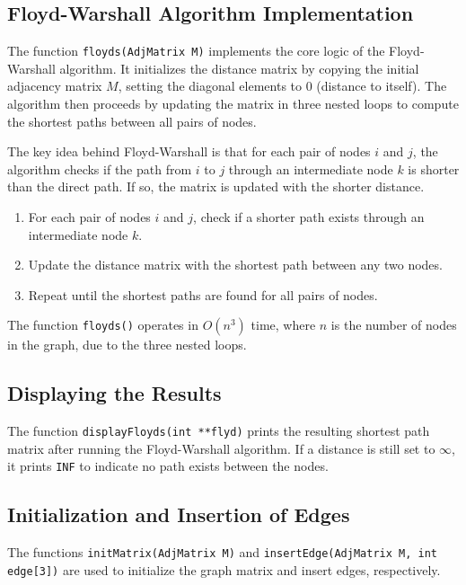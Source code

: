 \documentclass{book}
\begin{document}
\subsection{Floyd-Warshall Algorithm Implementation}

The function \texttt{floyds(AdjMatrix M)} implements the core logic of the Floyd-Warshall algorithm. It initializes the distance matrix by copying the initial adjacency matrix \( M \), setting the diagonal elements to 0 (distance to itself). The algorithm then proceeds by updating the matrix in three nested loops to compute the shortest paths between all pairs of nodes.

The key idea behind Floyd-Warshall is that for each pair of nodes \( i \) and \( j \), the algorithm checks if the path from \( i \) to \( j \) through an intermediate node \( k \) is shorter than the direct path. If so, the matrix is updated with the shorter distance.

\begin{enumerate}
    \item For each pair of nodes \( i \) and \( j \), check if a shorter path exists through an intermediate node \( k \).
    \item Update the distance matrix with the shortest path between any two nodes.
    \item Repeat until the shortest paths are found for all pairs of nodes.
\end{enumerate}

The function \texttt{floyds()} operates in \( O(n^3) \) time, where \( n \) is the number of nodes in the graph, due to the three nested loops.

\subsection{Displaying the Results}

The function \texttt{displayFloyds(int **flyd)} prints the resulting shortest path matrix after running the Floyd-Warshall algorithm. If a distance is still set to \(\infty\), it prints \texttt{INF} to indicate no path exists between the nodes.

\subsection{Initialization and Insertion of Edges}

The functions \texttt{initMatrix(AdjMatrix M)} and \texttt{insertEdge(AdjMatrix M, int edge[3])} are used to initialize the graph matrix and insert edges, respectively. 
\end{document}
